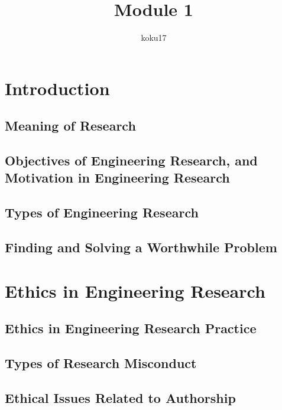 \documentclass{article}
\author{koku17}
\title{Module 1}
\begin{document}
	 \maketitle \newpage
	 \tableofcontents \newpage
	\section{Introduction}
	\subsection{Meaning of Research}
	\subsection{Objectives of Engineering Research, and Motivation in Engineering Research}
	\subsection{Types of Engineering Research}
	\subsection{Finding and Solving a Worthwhile Problem}
	
	\section{Ethics in Engineering Research}
	\subsection{Ethics in Engineering Research Practice}
	\subsection{Types of Research Misconduct}
	\subsection{Ethical Issues Related to Authorship}
\end{document}
